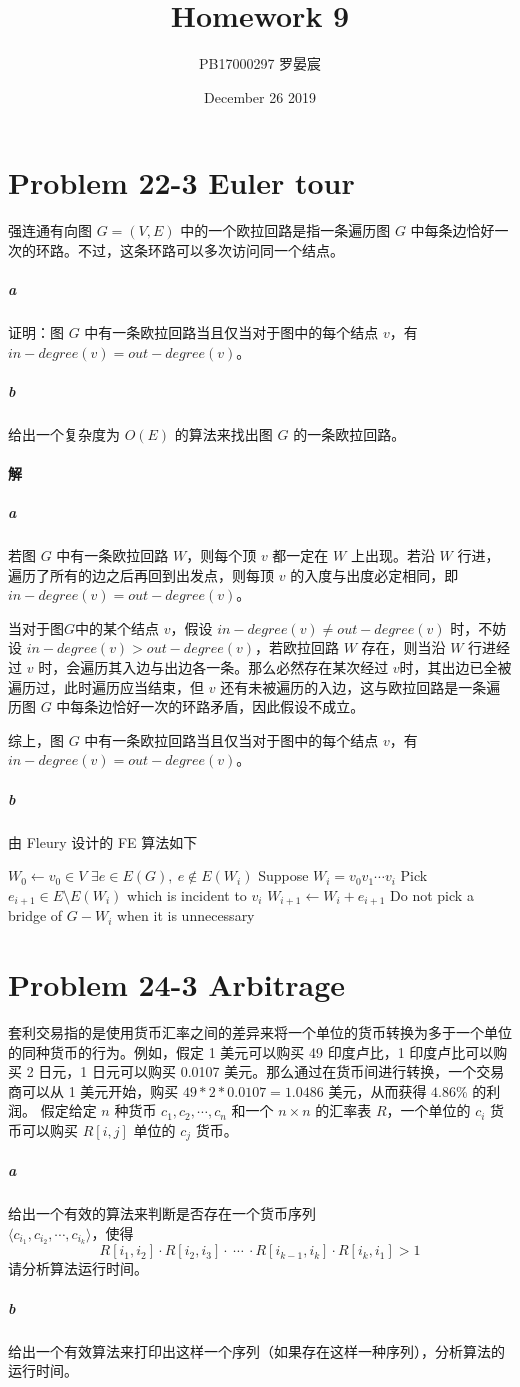\documentclass{article}
\title{Homework 9}
\author{PB17000297 罗晏宸}
\date{December 26 2019}
\begin{document}
\maketitle

\section{Problem 22-3 Euler tour}
强连通有向图 $G = (V,E)$ 中的一个欧拉回路是指一条遍历图 $G$ 中每条边恰好一次的环路。不过，这条环路可以多次访问同一个结点。
\subparagraph{a} 证明：图 $G$ 中有一条欧拉回路当且仅当对于图中的每个结点 $v$，有 $in−degree(v) = out−degree(v)$。
\subparagraph{b} 给出一个复杂度为 $O(E)$ 的算法来找出图 $G$ 的一条欧拉回路。

\paragraph{解}
\subparagraph{a}
若图 $G$ 中有一条欧拉回路 $W$，则每个顶 $v$ 都一定在 $W$ 上出现。若沿 $W$ 行进，遍历了所有的边之后再回到出发点，则每顶 $v$ 的入度与出度必定相同，即 $in−degree(v) = out−degree(v)$。\par
当对于图$G$中的某个结点 $v$，假设 $in−degree(v) \neq out−degree(v)$ 时，不妨设 $in−degree(v) > out−degree(v)$，若欧拉回路 $W$ 存在，则当沿 $W$ 行进经过 $v$ 时，会遍历其入边与出边各一条。那么必然存在某次经过 $v$时，其出边已全被遍历过，此时遍历应当结束，但 $v$ 还有未被遍历的入边，这与欧拉回路是一条遍历图 $G$ 中每条边恰好一次的环路矛盾，因此假设不成立。\par
综上，图 $G$ 中有一条欧拉回路当且仅当对于图中的每个结点 $v$，有 $in−degree(v) = out−degree(v)$。
\subparagraph{b}
由 Fleury 设计的 FE 算法如下
\begin{codebox}
	\li $W_0 \gets v_0 \in V$
	\li \While $\exists e \in E(G),\ e \notin E(W_i)$
		\Do
	\li		Suppose $W_i = v_0v_1\cdots v_i$
	\li 	Pick $e_{i+1} \in E \setminus E(W_i)$ which is incident to $v_i$
	\li 	$W_{i+1} \gets W_i + e_{i+1}$
	\li		Do not pick a bridge of $G - W_i$ when it is unnecessary
		\End
\end{codebox}

\section{Problem 24-3 Arbitrage}
套利交易指的是使用货币汇率之间的差异来将一个单位的货币转换为多于一个单位的同种货币的行为。例如，假定 1 美元可以购买 49 印度卢比，1 印度卢比可以购买 2 日元，1 日元可以购买 0.0107 美元。那么通过在货币间进行转换，一个交易商可以从 1 美元开始，购买 $49*2*0.0107=1.0486$ 美元，从而获得 $4.86\%$ 的利润。
假定给定 $n$ 种货币 $c_1, c_2, \cdots, c_n$ 和一个 $n \times n$ 的汇率表 $R$，一个单位的 $c_i$ 货币可以购买 $R[i, j]$ 单位的 $c_j$ 货币。
\subparagraph{a} 给出一个有效的算法来判断是否存在一个货币序列 \\
$\langle c_{i_1}, c_{i_2}, \cdots, c_{i_k} \rangle$，使得
\begin{equation*}
	R[i_1, i_2] \cdot R[i_2, i_3] \cdot\ \cdots\ \cdot R[i_{k−1}, i_k] \cdot R[i_k, i_1] > 1
\end{equation*}
请分析算法运行时间。
\subparagraph{b} 给出一个有效算法来打印出这样一个序列（如果存在这样一种序列），分析算法的运行时间。
\end{document}
